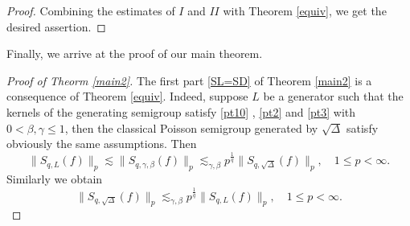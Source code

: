 \documentclass[oneside,english,a4wide]{amsart}
\numberwithin{equation}{section}
\numberwithin{figure}{section}
\theoremstyle{plain}
\theoremstyle{plain}
\theoremstyle{definition}
\theoremstyle{plain}
\theoremstyle{remark}
\theoremstyle{definition}
\theoremstyle{remark}
\theoremstyle{definition}
\newcommand{\8}{+\infty}
\renewcommand{\1}{\mathbbm{1}}
\begin{document}
{\begin{proof}
Combining the estimates of $I$ and $II$ with Theorem \ref{equiv}, we get the desired assertion.
\end{proof}

Finally, we arrive at the proof of our main theorem.

\begin{proof}[Proof of Theorm \ref{main2}]
    The first part \eqref{SL=SD} of Theorem \ref{main2} is a consequence of Theorem \ref{equiv}. Indeed, suppose $L$ be a generator such that the kernels of the generating semigroup satisfy \eqref{pt10} , \eqref{pt2} and \eqref{pt3} with $0 < \beta, \gamma \leq 1$, then the classical Poisson semigroup generated by $\sqrt{\Delta}$ satisfy obviously the same assumptions. Then
    \[ 
        \| S_{q,L}(f) \|_p \lesssim \| S_{q, \gamma, \beta}(f) \|_p \lesssim_{\gamma, \beta}  p^{\frac{1}{q}}\| S_{q, \sqrt{\Delta}}(f)  \|_p, \quad 1 \leq p < \infty.
    \]
    Similarly we obtain
    \[
        \| S_{q, \sqrt{\Delta}}(f)  \|_p \lesssim_{\gamma, \beta}p^{\frac{1}{q}}\| S_{q,L}(f) \|_p, \quad 1 \leq p < \infty.
    \]
    

\end{proof}}
\end{document}
